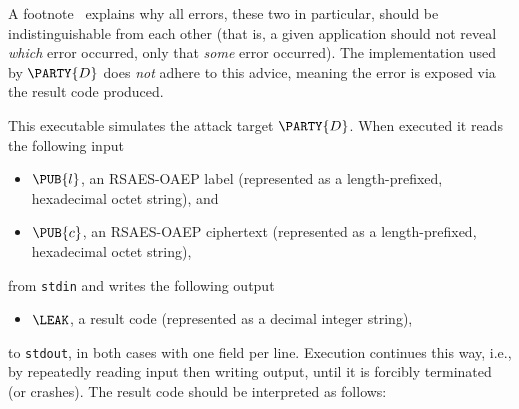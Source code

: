\documentclass[crop={false},multi={true},tikz={true}]{standalone}
\begin{document}
\noindent
A footnote~\cite[Section 7.1.2]{SCALE:RFC:3447} explains why all errors, 
these two in particular, should be indistinguishable from each other (that
is, a given application should not reveal {\em which} error occurred, only 
that {\em some} error occurred).  The implementation used by $\PARTY{D}$ 
does {\em not} adhere to this advice, meaning the error is exposed via 
the result code produced.



This executable simulates the attack target $\PARTY{D}$.  When executed it 
reads the following input

\begin{itemize}
\item $\PUB{l}$,
      an RSAES-OAEP label
      (represented as a  length-prefixed, hexadecimal octet   string),
      and
\item $\PUB{c}$,
      an RSAES-OAEP ciphertext
      (represented as a  length-prefixed, hexadecimal octet   string),
\end{itemize}

\noindent
from \lstinline[language={bash}]{stdin} and writes the following output

\begin{itemize}
\item $\LEAK$,
      a  result code
      (represented as a                       decimal integer string),
\end{itemize}

\noindent
to \lstinline[language={bash}]{stdout}, in both cases with one field per 
line.  Execution continues this way, i.e., by repeatedly reading input 
then writing output, until it is forcibly terminated (or crashes).  
The result code should be interpreted as follows:
\end{document}
